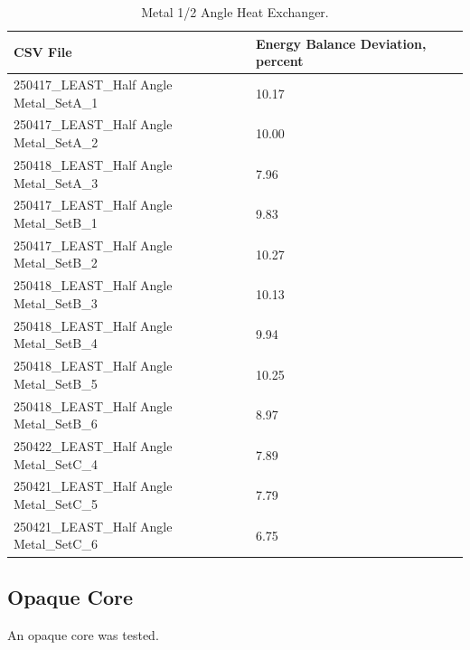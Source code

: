 \documentclass[12pt]{article}
\begin{document}
\begin{table}[h]
	\centering
	\caption{Metal 1/2 Angle Heat Exchanger.}
	\label{tab:resultsHalfAngle}
	\begin{tabular}{|l|l|}
		\hline
		\textbf{CSV File} & \textbf{Energy Balance Deviation, percent} \\
		\hline
			250417\_LEAST\_Half Angle Metal\_SetA\_1 & 10.17  \\
			250417\_LEAST\_Half Angle Metal\_SetA\_2 & 10.00  \\
			250418\_LEAST\_Half Angle Metal\_SetA\_3 & 7.96  \\
			250417\_LEAST\_Half Angle Metal\_SetB\_1 & 9.83  \\
			250417\_LEAST\_Half Angle Metal\_SetB\_2 & 10.27  \\
			250418\_LEAST\_Half Angle Metal\_SetB\_3 & 10.13  \\
			250418\_LEAST\_Half Angle Metal\_SetB\_4 & 9.94  \\
			250418\_LEAST\_Half Angle Metal\_SetB\_5 & 10.25  \\
			250418\_LEAST\_Half Angle Metal\_SetB\_6 & 8.97  \\
			250422\_LEAST\_Half Angle Metal\_SetC\_4 & 7.89  \\
			250421\_LEAST\_Half Angle Metal\_SetC\_5 & 7.79  \\
			250421\_LEAST\_Half Angle Metal\_SetC\_6 & 6.75  \\
		\hline
	\end{tabular}
\end{table}




\subsection{Opaque Core} 
An opaque core was tested.
\end{document}
